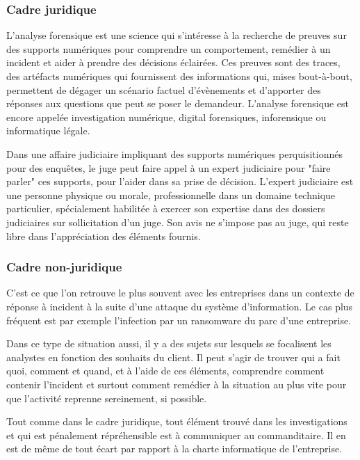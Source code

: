 

\subsubsection{Cadre juridique}

L'analyse forensique est une science qui s'intéresse à la recherche de preuves sur des supports numériques pour comprendre un comportement, remédier à un incident et aider à prendre des décisions éclairées. Ces preuves sont des traces, des artéfacts numériques qui fournissent des informations qui, mises bout-à-bout, permettent de dégager un scénario factuel d'évènements et d'apporter des réponses aux questions que peut se poser le demandeur. L'analyse forensique est encore appelée investigation numérique, digital forensiques, inforensique ou informatique légale.


Dans une affaire judiciaire impliquant des supports numériques perquisitionnés pour des enquêtes, le juge peut faire appel à un expert judiciaire pour "faire parler" ces supports, pour l'aider dans sa prise de décision. L'expert judiciaire est une personne physique ou morale, professionnelle dans un domaine technique particulier, spécialement habilitée à exercer son expertise dans des dossiers judiciaires sur sollicitation d'un juge. Son avis ne s'impose pas au juge, qui reste libre dans l'appréciation des éléments fournis.


\subsubsection{Cadre non-juridique}

C'est ce que l'on retrouve le plus souvent avec les entreprises dans un contexte de réponse à incident à la suite d'une attaque du système d'information. Le cas plus fréquent est par exemple l'infection par un ransomware du parc d'une entreprise.

Dans ce type de situation aussi, il y a des sujets sur lesquels se focalisent les analystes en fonction des souhaits du client. Il peut s'agir de trouver qui a fait quoi, comment et quand, et à l'aide de ces éléments, comprendre comment contenir l'incident et surtout comment remédier à la situation au plus vite pour que l'activité reprenne sereinement, si possible.

Tout comme dans le cadre juridique, tout élément trouvé dans les investigations et qui est pénalement répréhensible est à communiquer au commanditaire. Il en est de même de tout écart par rapport à la charte informatique de l'entreprise.

